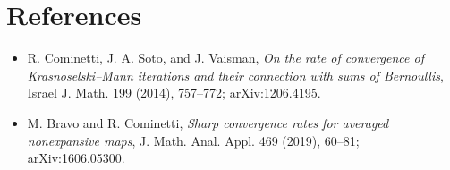 \documentclass[11pt]{article}
\begin{document}
\section*{References}

\begin{itemize}
\item R. Cominetti, J. A. Soto, and J. Vaisman,
\emph{On the rate of convergence of Krasnoselski--Mann iterations and
their connection with sums of Bernoullis}, Israel J. Math. 199 (2014),
757--772; arXiv:1206.4195.
\item M. Bravo and R. Cominetti,
\emph{Sharp convergence rates for averaged nonexpansive maps},
J. Math. Anal. Appl. 469 (2019), 60--81; arXiv:1606.05300.
\end{itemize}
\end{document}
